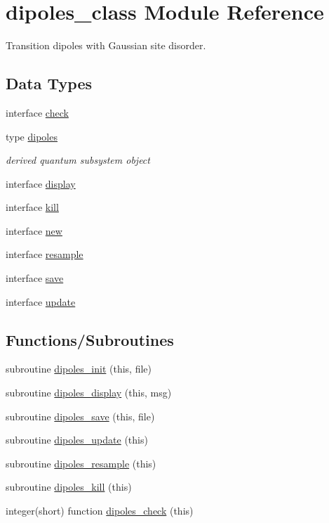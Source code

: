 \hypertarget{namespacedipoles__class}{}\section{dipoles\+\_\+class Module Reference}
\label{namespacedipoles__class}


Transition dipoles with Gaussian site disorder.  


\subsection*{Data Types}
\begin{DoxyCompactItemize}
\item 
interface \hyperlink{interfacedipoles__class_1_1check}{check}
\item 
type \hyperlink{structdipoles__class_1_1dipoles}{dipoles}
\begin{DoxyCompactList}\small\item\em derived quantum subsystem object \end{DoxyCompactList}\item 
interface \hyperlink{interfacedipoles__class_1_1display}{display}
\item 
interface \hyperlink{interfacedipoles__class_1_1kill}{kill}
\item 
interface \hyperlink{interfacedipoles__class_1_1new}{new}
\item 
interface \hyperlink{interfacedipoles__class_1_1resample}{resample}
\item 
interface \hyperlink{interfacedipoles__class_1_1save}{save}
\item 
interface \hyperlink{interfacedipoles__class_1_1update}{update}
\end{DoxyCompactItemize}
\subsection*{Functions/\+Subroutines}
\begin{DoxyCompactItemize}
\item 
subroutine \hyperlink{namespacedipoles__class_a947aef5d45c6e39accc6c0e20f619c57}{dipoles\+\_\+init} (this, file)
\item 
subroutine \hyperlink{namespacedipoles__class_a732ca8b1573dd77731c6272ce551bc70}{dipoles\+\_\+display} (this, msg)
\item 
subroutine \hyperlink{namespacedipoles__class_a9ab428011961577796577f9cdeb032b4}{dipoles\+\_\+save} (this, file)
\item 
subroutine \hyperlink{namespacedipoles__class_a9157bf14add87f3f26edfbc88c0da6fe}{dipoles\+\_\+update} (this)
\item 
subroutine \hyperlink{namespacedipoles__class_a2d80cb493920a4619e0e83abfcb033f6}{dipoles\+\_\+resample} (this)
\item 
subroutine \hyperlink{namespacedipoles__class_ab610221599ac72fa22a02617e550033b}{dipoles\+\_\+kill} (this)
\item 
integer(short) function \hyperlink{namespacedipoles__class_acf34b0d8a2cae92c5b35a03eb9c0237b}{dipoles\+\_\+check} (this)
\end{DoxyCompactItemize}


